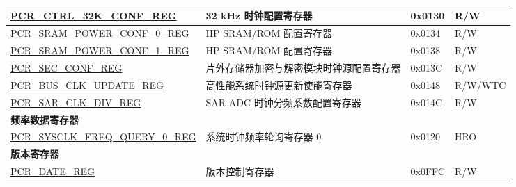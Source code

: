 \begin{longtable}{ | p{7.2cm} | p{6cm} | p{1.3cm} | p{1cm} | }
\hyperref[regdesc:PCRCTRL32KCONFREG]{PCR\_CTRL\_32K\_CONF\_REG} & 32 kHz 时钟配置寄存器 & 0x0130 & R/W \\ \hline
\hyperref[regdesc:PCRSRAMPOWERCONF0REG]{PCR\_SRAM\_POWER\_CONF\_0\_REG} & HP SRAM/ROM 配置寄存器 & 0x0134 & R/W \\ \hline
\hyperref[regdesc:PCRSRAMPOWERCONF1REG]{PCR\_SRAM\_POWER\_CONF\_1\_REG} & HP SRAM/ROM 配置寄存器 & 0x0138 & R/W \\ \hline
\hyperref[regdesc:PCRSECCONFREG]{PCR\_SEC\_CONF\_REG} & 片外存储器加密与解密模块时钟源配置寄存器 & 0x013C & R/W \\ \hline
\hyperref[regdesc:PCRBUSCLKUPDATEREG]{PCR\_BUS\_CLK\_UPDATE\_REG} & 高性能系统时钟源更新使能寄存器 & 0x0148 & R/W/WTC \\ \hline
\hyperref[regdesc:PCRSARCLKDIVREG]{PCR\_SAR\_CLK\_DIV\_REG} & SAR ADC 时钟分频系数配置寄存器 & 0x014C & R/W \\ \hline
\multicolumn{4}{|l|}{\textbf{频率数据寄存器}} \\ \hline
\hyperref[regdesc:PCRSYSCLKFREQQUERY0REG]{PCR\_SYSCLK\_FREQ\_QUERY\_0\_REG} & 系统时钟频率轮询寄存器 0 & 0x0120 & HRO \\ \hline
\multicolumn{4}{|l|}{\textbf{版本寄存器}} \\ \hline
\hyperref[regdesc:PCRDATEREG]{PCR\_DATE\_REG} & 版本控制寄存器 & 0x0FFC & R/W \\ \hline
\end{longtable}
